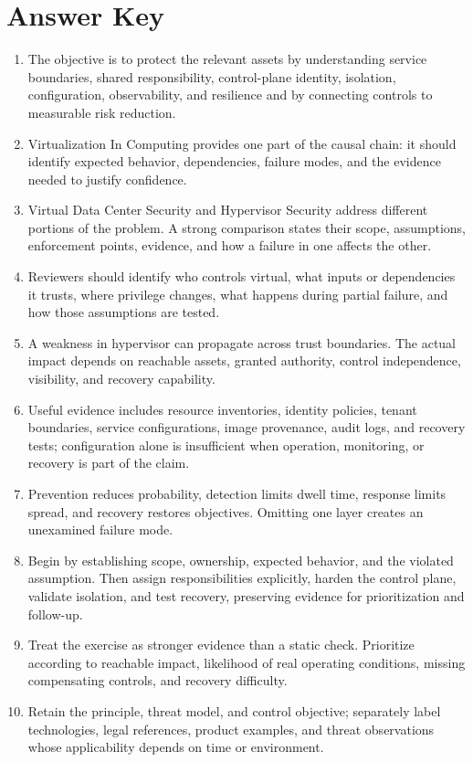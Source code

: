 \documentclass[11pt,letterpaper]{article}
\begin{document}
\section*{Answer Key}
\begin{enumerate}
\item The objective is to protect the relevant assets by understanding service boundaries, shared responsibility, control-plane identity, isolation, configuration, observability, and resilience and by connecting controls to measurable risk reduction.
\item Virtualization In Computing provides one part of the causal chain: it should identify expected behavior, dependencies, failure modes, and the evidence needed to justify confidence.
\item Virtual Data Center Security and Hypervisor Security address different portions of the problem. A strong comparison states their scope, assumptions, enforcement points, evidence, and how a failure in one affects the other.
\item Reviewers should identify who controls virtual, what inputs or dependencies it trusts, where privilege changes, what happens during partial failure, and how those assumptions are tested.
\item A weakness in hypervisor can propagate across trust boundaries. The actual impact depends on reachable assets, granted authority, control independence, visibility, and recovery capability.
\item Useful evidence includes resource inventories, identity policies, tenant boundaries, service configurations, image provenance, audit logs, and recovery tests; configuration alone is insufficient when operation, monitoring, or recovery is part of the claim.
\item Prevention reduces probability, detection limits dwell time, response limits spread, and recovery restores objectives. Omitting one layer creates an unexamined failure mode.
\item Begin by establishing scope, ownership, expected behavior, and the violated assumption. Then assign responsibilities explicitly, harden the control plane, validate isolation, and test recovery, preserving evidence for prioritization and follow-up.
\item Treat the exercise as stronger evidence than a static check. Prioritize according to reachable impact, likelihood of real operating conditions, missing compensating controls, and recovery difficulty.
\item Retain the principle, threat model, and control objective; separately label technologies, legal references, product examples, and threat observations whose applicability depends on time or environment.
\end{enumerate}
\end{document}
